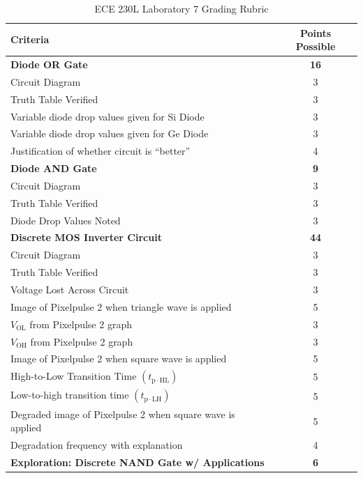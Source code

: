 \documentclass[12pt]{../manual}
\begin{document}
%
\newpage
\def\arraystretch{1.2}
{}
\hspace{0pt}
\vfill %
\begin{table}[ht!]
\caption{ECE 230L Laboratory 7 Grading Rubric}
\centering
\begin{tabular}{l|c} \hline
Criteria & Points Possible \\ \hline \hline
\textbf{Diode OR Gate}			& \textbf{16} \\
Circuit Diagram 				& 3 \\
Truth Table Verified			& 3 \\
Variable diode drop values given for Si Diode & 3 \\
Variable diode drop values given for Ge Diode & 3 \\
Justification of whether circuit is ``better'' & 4 \\ \hline
\textbf{Diode AND Gate}			& \textbf{9} \\
Circuit Diagram 				& 3 \\
Truth Table Verified			& 3 \\
Diode Drop Values Noted			& 3 \\ \hline
\textbf{Discrete MOS Inverter Circuit}		& \textbf{44} \\
Circuit Diagram 				& 3 \\
Truth Table Verified			& 3 \\
Voltage Lost Across Circuit 	& 3 \\
Image of Pixelpulse 2 when triangle wave is applied & 5 \\
$V_\mathrm{OL}$ from Pixelpulse 2 graph 	& 3 \\
$V_\mathrm{OH}$ from Pixelpulse 2 graph	& 3 \\
Image of Pixelpulse 2 when square wave is applied & 5 \\
High-to-Low Transition Time $(t_\mathrm{p \cdot HL})$ & 5 \\
Low-to-high transition time $(t_\mathrm{p \cdot LH})$ & 5 \\
Degraded image of Pixelpulse 2 when square wave is applied & 5 \\
Degradation frequency with explanation & 4 \\ \hline
{\bf Exploration: Discrete NAND Gate w/ Applications} & {\bf 6} \\

\end{tabular}
\end{table}
\end{document}

